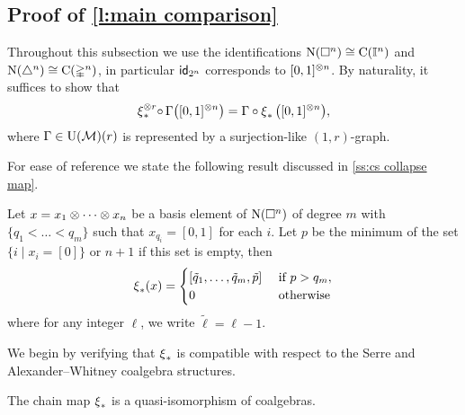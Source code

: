 \subsection{Proof of \cref{l:main comparison}} \label{ss:comparison proof}

Throughout this subsection we use the identifications $\operatorname{N}(\square^n) \cong \operatorname{C}(\mathbb{I}^n)$ and $\operatorname{N}(\triangle^n) \cong \operatorname{C}(\mathbb{\Delta}^n)$, in particular $\mathsf{id}_{2^n}$ corresponds to $[0,1]^{\otimes n}$.
By naturality, it suffices to show that
\begin{equation} \label{e:Cartan--Serre E-coalgebra map}
\operatorname{\xi}_\ast^{\otimes r} \! \circ \, \Gamma \big( [0,1]^{\otimes n} \big) =
\Gamma \circ \operatorname{\xi}_\ast \big( [0,1]^{\otimes n} \big),
\end{equation}
where $\Gamma \in {\operatorname{U}(\mathcal{M})}(r)$ is represented by a surjection-like $(1,r)$-graph.

For ease of reference we state the following result discussed in \cref{ss:cs collapse map}.

\begin{lemma} \label{l:cs collapse chain map explicit}
	Let $x = x_1 \otimes \cdots \otimes x_n$ be a basis element of $\operatorname{N}(\square^n)$ of degree $m$ with $\{q_1 < \dots < q_m\}$ such that $x_{q_i} = [0,1]$ for each $i$.
	Let $p$ be the minimum of the set $\{i \mid x_i = [0]\}$ or $n+1$ if this set is empty, then
	\[
	\operatorname{\xi}_\ast(x) = \begin{cases}
	[\tilde q_1, \dots, \tilde q_m, \tilde p] & \text{ if } p > q_m, \\
	0 & \text{ otherwise}
	\end{cases}
	\]
	where for any integer $\ell$, we write $\tilde \ell = \ell-1$.
\end{lemma}

We begin by verifying that $\operatorname{\xi}_\ast$ is compatible with respect to the Serre and Alexander--Whitney coalgebra structures.

\begin{lemma}
	The chain map $\operatorname{\xi}_\ast$ is a quasi-isomorphism of coalgebras.
\end{lemma}

